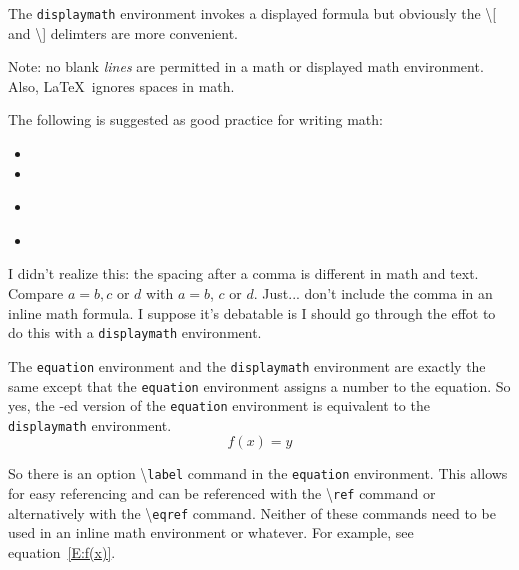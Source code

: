 \documentclass[12pt]{amsart}
\begin{document}
The \texttt{displaymath} environment invokes a displayed formula but obviously the \textbackslash[ and \textbackslash] delimters are more convenient.

Note: no blank \emph{lines} are permitted in a math or displayed math environment. Also, \LaTeX \ ignores spaces in math.
\vspace{15pt}

The following is suggested as good practice for writing math:
\begin{itemize}
   \item {}
   \item {}
   \item {} \\
   \item {} \\
\end{itemize}

I didn't realize this: the spacing after a comma is different in math and text. Compare \(a = b,c\) or \(d\) with \(a = b\), \(c\) or \(d\). Just... don't include the comma in an inline math formula. I suppose it's debatable is I should go through the effot to do this with a \texttt{displaymath} environment. 


The \texttt{equation} environment and the \texttt{displaymath} environment are exactly the same except that the \texttt{equation} environment assigns a number to the equation. So yes, the \textasteriskcentered-ed version of the \texttt{equation} environment is equivalent to the \texttt{displaymath} environment.
\begin{equation} \label{E:f(x)}
   f(x) = y
\end{equation}
\vspace{15pt}

So there is an option \textbackslash \texttt{label} command in the \texttt{equation} environment. This allows for easy referencing and can be referenced with the \textbackslash \texttt{ref} command or alternatively with the \textbackslash \texttt{eqref} command. Neither of these commands need to be used in an inline math environment or whatever. For example, see equation~\eqref{E:f(x)}.
\end{document}
